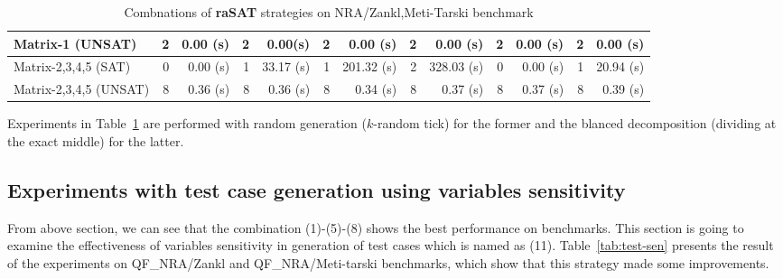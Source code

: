 \documentclass[runningheads,a4paper,oribibl]{llncs}
\begin{document}
\begin{table}[t]
{\begin{tabular}{ | l | r | r | r | r  | r | r | r | r | r | r |r | r |}
\\
\hline
 Matrix-1 (UNSAT) & 2 & 0.00 (s)& 2 & 0.00(s) & 2 & 0.00 (s)& 2 & 0.00 (s)& 2 & 0.00 (s)& 2 & 0.00 (s)
\\
\hline
 Matrix-2,3,4,5 (SAT) & 0 & 0.00 (s)& 1 & 33.17 (s)& 1 & 201.32 (s)& 2 & 328.03 (s)& 0 & 0.00 (s)& 1 & 20.94 (s)
\\
\hline
 Matrix-2,3,4,5 (UNSAT) & 8 & 0.36 (s)& 8 & 0.36 (s)& 8 & 0.34 (s)& 8 & 0.37 (s)& 8 & 0.37 (s)& 8 & 0.39 (s)
\\
\hline
\end{tabular}
}
\bigskip
{}
\medskip
\caption{Combnations of {\bf raSAT} strategies on NRA/Zankl,Meti-Tarski benchmark} 
\label{tab:rasat-experiments}
\end{table}

Experiments in Table~\ref{tab:rasat-experiments} are performed 
with random generation ($k$-random tick) for the former and the blanced decomposition 
(dividing at the exact middle) for the latter. 

\subsection*{Experiments with test case generation using variables sensitivity}
From above section, we can see that the combination (1)-(5)-(8) shows the best performance on benchmarks. This section is going to examine the effectiveness of variables sensitivity in generation of test cases which is named as (11). Table~\ref{tab:test-sen} presents the result of the experiments on QF\_NRA/Zankl and QF\_NRA/Meti-tarski benchmarks, which show that this strategy made some improvements.
\end{document}
